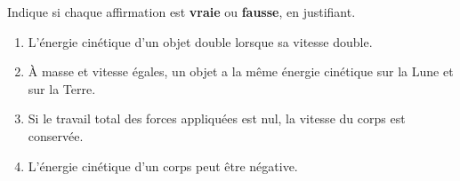 \documentclass[11pt,a4paper]{article}
\begin{document}
\begin{exo}
Indique si chaque affirmation est \textbf{vraie} ou \textbf{fausse}, en justifiant.
\begin{enumerate}[label=\alph*)]
  \item L'énergie cinétique d'un objet double lorsque sa vitesse double.
  \item À masse et vitesse égales, un objet a la même énergie cinétique sur la Lune et sur la Terre.
  \item Si le travail total des forces appliquées est nul, la vitesse du corps est conservée.
  \item L'énergie cinétique d'un corps peut être négative.
\end{enumerate}
\end{exo}
\end{document}
